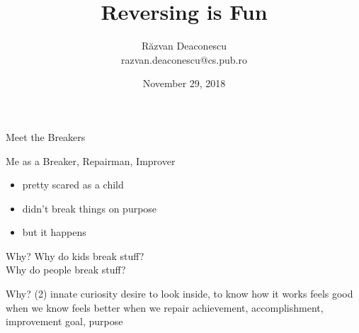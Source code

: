 \documentclass{simple}
\title[Reversing is Fun]{Reversing is Fun}
\institute{CompSoc, University of Leeds}
\author[Răzvan Deaconescu]{Răzvan Deaconescu \\
razvan.deaconescu@cs.pub.ro}
\date{November 29, 2018}
\begin{document}
\frame{\titlepage}

\begin{frame}{Meet the Breakers}
\end{frame}

\begin{frame}{Me as a Breaker, Repairman, Improver}
  \begin{itemize}
    \pause \item pretty scared as a child
    \pause \item didn't break things on purpose
    \pause \item but it happens
  \end{itemize}
\end{frame}

\begin{frame}{}
\end{frame}

\begin{frame}{}
\end{frame}

\begin{frame}{}
\end{frame}

\begin{frame}{}
\end{frame}

\begin{frame}{Why?}
  \centering
  \pause \Large{Why do kids break stuff?} \\
  \vspace{1cm}
  \pause \Large{Why do people break stuff?}
  \vspace{1cm}
\end{frame}

\begin{frame}{Why? (2)}
  \centering
  \pause \Large{innate curiosity}
  \vspace{1cm}
  \pause \Large{desire to look inside, to know how it works}
  \vspace{1cm}
  \pause \Large{feels good when we know}
  \vspace{1cm}
  \pause \Large{feels better when we repair}
  \vspace{1cm}
  \pause \Large{achievement, accomplishment, improvement}
  \vspace{1cm}
  \pause \Large{goal, purpose}
\end{frame}
\end{document}
